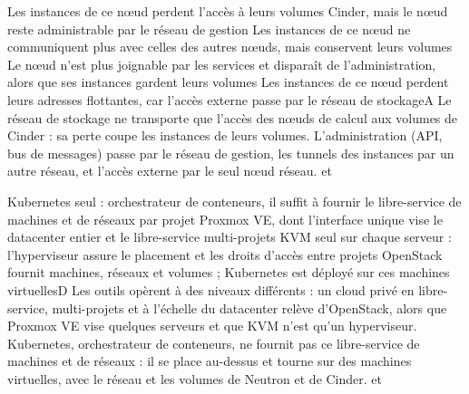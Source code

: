   {Les instances de ce nœud perdent l'accès à leurs volumes Cinder, mais le nœud reste administrable par le réseau de gestion}
  {Les instances de ce nœud ne communiquent plus avec celles des autres nœuds, mais conservent leurs volumes}
  {Le nœud n'est plus joignable par les services et disparaît de l'administration, alors que ses instances gardent leurs volumes}
  {Les instances de ce nœud perdent leurs adresses flottantes, car l'accès externe passe par le réseau de stockage}{A}
  {Le réseau de stockage ne transporte que l'accès des nœuds de calcul aux volumes de Cinder : sa perte coupe les instances de leurs volumes. L'administration (API, bus de messages) passe par le réseau de gestion, les tunnels des instances par un autre réseau, et l'accès externe par le seul nœud réseau.}
  { et }

  {Kubernetes seul : orchestrateur de conteneurs, il suffit à fournir le libre-service de machines et de réseaux par projet}
  {Proxmox VE, dont l'interface unique vise le datacenter entier et le libre-service multi-projets}
  {KVM seul sur chaque serveur : l'hyperviseur assure le placement et les droits d'accès entre projets}
  {OpenStack fournit machines, réseaux et volumes ; Kubernetes est déployé sur ces machines virtuelles}{D}
  {Les outils opèrent à des niveaux différents : un cloud privé en libre-service, multi-projets et à l'échelle du datacenter relève d'OpenStack, alors que Proxmox VE vise quelques serveurs et que KVM n'est qu'un hyperviseur. Kubernetes, orchestrateur de conteneurs, ne fournit pas ce libre-service de machines et de réseaux : il se place au-dessus et tourne sur des machines virtuelles, avec le réseau et les volumes de Neutron et de Cinder.}
  { et }


